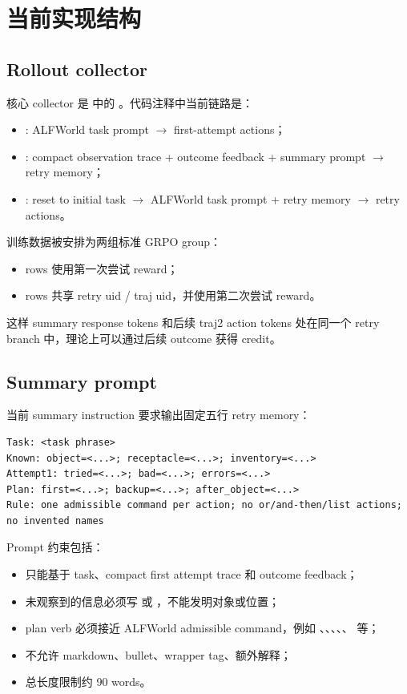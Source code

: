 \documentclass[10pt]{ctexart}
\begin{document}
\section{当前实现结构}

\subsection{Rollout collector}
核心 collector 是  中的 。代码注释中当前链路是：
\begin{itemize}
  \item {}: ALFWorld task prompt $\rightarrow$ first-attempt actions；
  \item {}: compact observation trace + outcome feedback + summary prompt $\rightarrow$ retry memory；
  \item {}: reset to initial task $\rightarrow$ ALFWorld task prompt + retry memory $\rightarrow$ retry actions。
\end{itemize}

训练数据被安排为两组标准 GRPO group：
\begin{itemize}
  \item {} rows 使用第一次尝试 reward；
  \item {} rows 共享 retry uid / traj uid，并使用第二次尝试 reward。
\end{itemize}
这样 summary response tokens 和后续 traj2 action tokens 处在同一个 retry branch 中，理论上可以通过后续 outcome 获得 credit。

\subsection{Summary prompt}
当前 summary instruction 要求输出固定五行 retry memory：
\begin{lstlisting}
Task: <task phrase>
Known: object=<...>; receptacle=<...>; inventory=<...>
Attempt1: tried=<...>; bad=<...>; errors=<...>
Plan: first=<...>; backup=<...>; after_object=<...>
Rule: one admissible command per action; no or/and-then/list actions; no invented names
\end{lstlisting}

Prompt 约束包括：
\begin{itemize}
  \item 只能基于 task、compact first attempt trace 和 outcome feedback；
  \item 未观察到的信息必须写  或 ，不能发明对象或位置；
  \item plan verb 必须接近 ALFWorld admissible command，例如 、、、、、 等；
  \item 不允许 markdown、bullet、wrapper tag、额外解释；
  \item 总长度限制约 90 words。
\end{itemize}
\end{document}
